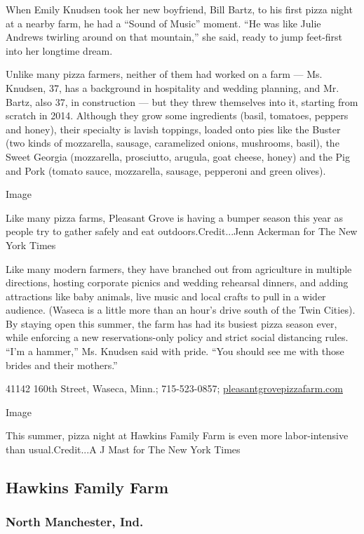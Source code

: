 When Emily Knudsen took her new boyfriend, Bill Bartz, to his first
pizza night at a nearby farm, he had a ``Sound of Music'' moment. ``He
was like Julie Andrews twirling around on that mountain,'' she said,
ready to jump feet-first into her longtime dream.

Unlike many pizza farmers, neither of them had worked on a farm --- Ms.
Knudsen, 37, has a background in hospitality and wedding planning, and
Mr. Bartz, also 37, in construction --- but they threw themselves into
it, starting from scratch in 2014. Although they grow some ingredients
(basil, tomatoes, peppers and honey), their specialty is lavish
toppings, loaded onto pies like the Buster (two kinds of mozzarella,
sausage, caramelized onions, mushrooms, basil), the Sweet Georgia
(mozzarella, prosciutto, arugula, goat cheese, honey) and the Pig and
Pork (tomato sauce, mozzarella, sausage, pepperoni and green olives).

Image

Like many pizza farms, Pleasant Grove is having a bumper season this
year as people try to gather safely and eat outdoors.Credit...Jenn
Ackerman for The New York Times

Like many modern farmers, they have branched out from agriculture in
multiple directions, hosting corporate picnics and wedding rehearsal
dinners, and adding attractions like baby animals, live music and local
crafts to pull in a wider audience. (Waseca is a little more than an
hour's drive south of the Twin Cities). By staying open this summer, the
farm has had its busiest pizza season ever, while enforcing a new
reservations-only policy and strict social distancing rules. ``I'm a
hammer,'' Ms. Knudsen said with pride. ``You should see me with those
brides and their mothers.''

41142 160th Street, Waseca, Minn.; 715-523-0857;
\href{https://www.pleasantgrovepizzafarm.com/}{pleasantgrovepizzafarm.com}

Image

This summer, pizza night at Hawkins Family Farm is even more
labor-intensive than usual.Credit...A J Mast for The New York Times

\hypertarget{hawkins-family-farm}{%
\subsection{Hawkins Family Farm}\label{hawkins-family-farm}}

\hypertarget{north-manchester-ind}{%
\subsubsection{North Manchester, Ind.}\label{north-manchester-ind}}

